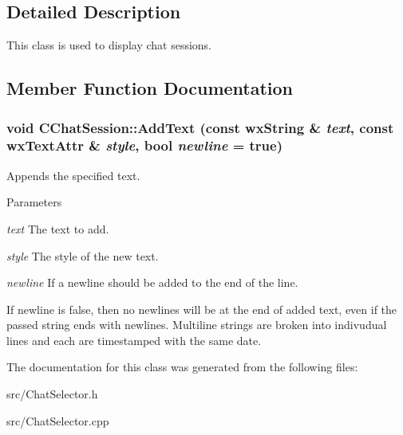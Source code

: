 \subsection{Detailed Description}
This class is used to display chat sessions. 

\subsection{Member Function Documentation}
\subsubsection[{AddText}]{\setlength{\rightskip}{0pt plus 5cm}void CChatSession::AddText (const wxString \& {\em text}, \/  const wxTextAttr \& {\em style}, \/  bool {\em newline} = {\ttfamily true})}\label{classCChatSession_a7f9fff4cf816b167b6a3898e69188f04}


Appends the specified text. 
\begin{DoxyParams}{Parameters}
\item[{\em text}]The text to add. \item[{\em style}]The style of the new text. \item[{\em newline}]If a newline should be added to the end of the line.\end{DoxyParams}
If newline is false, then no newlines will be at the end of added text, even if the passed string ends with newlines. Multiline strings are broken into indivudual lines and each are timestamped with the same date. 

The documentation for this class was generated from the following files:\begin{DoxyCompactItemize}
\item 
src/ChatSelector.h\item 
src/ChatSelector.cpp\end{DoxyCompactItemize}
